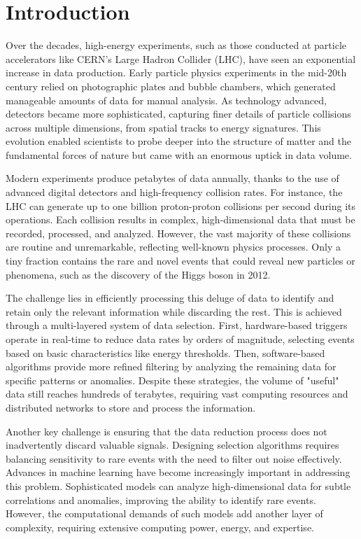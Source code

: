 \section{Introduction}

Over the decades, high-energy experiments, such as those conducted at particle accelerators like CERN’s Large Hadron Collider (LHC), have seen an exponential increase in data production. Early particle physics experiments in the mid-20th century relied on photographic plates and bubble chambers, which generated manageable amounts of data for manual analysis. As technology advanced, detectors became more sophisticated, capturing finer details of particle collisions across multiple dimensions, from spatial tracks to energy signatures. This evolution enabled scientists to probe deeper into the structure of matter and the fundamental forces of nature but came with an enormous uptick in data volume.

Modern experiments produce petabytes of data annually, thanks to the use of advanced digital detectors and high-frequency collision rates. For instance, the LHC can generate up to one billion proton-proton collisions per second during its operations. Each collision results in complex, high-dimensional data that must be recorded, processed, and analyzed. However, the vast majority of these collisions are routine and unremarkable, reflecting well-known physics processes. Only a tiny fraction contains the rare and novel events that could reveal new particles or phenomena, such as the discovery of the Higgs boson in 2012.

The challenge lies in efficiently processing this deluge of data to identify and retain only the relevant information while discarding the rest. This is achieved through a multi-layered system of data selection. First, hardware-based triggers operate in real-time to reduce data rates by orders of magnitude, selecting events based on basic characteristics like energy thresholds. Then, software-based algorithms provide more refined filtering by analyzing the remaining data for specific patterns or anomalies. Despite these strategies, the volume of "useful" data still reaches hundreds of terabytes, requiring vast computing resources and distributed networks to store and process the information.

Another key challenge is ensuring that the data reduction process does not inadvertently discard valuable signals. Designing selection algorithms requires balancing sensitivity to rare events with the need to filter out noise effectively. Advances in machine learning have become increasingly important in addressing this problem. Sophisticated models can analyze high-dimensional data for subtle correlations and anomalies, improving the ability to identify rare events. However, the computational demands of such models add another layer of complexity, requiring extensive computing power, energy, and expertise.

